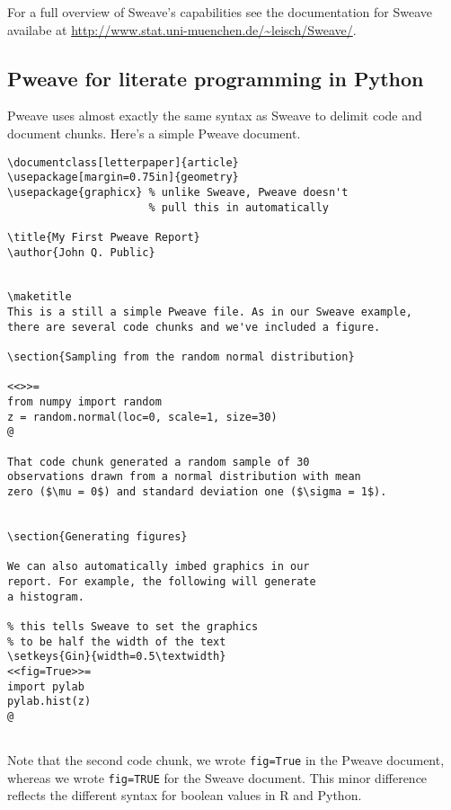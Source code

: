 For a full overview of Sweave's capabilities see the documentation for
Sweave availabe at
\url{http://www.stat.uni-muenchen.de/~leisch/Sweave/}.

\subsection{Pweave for literate programming in Python}

Pweave uses almost exactly the same syntax as Sweave to delimit code and
document chunks. Here's a simple Pweave document.

\begin{lstlisting}
\documentclass[letterpaper]{article}
\usepackage[margin=0.75in]{geometry}
\usepackage{graphicx} % unlike Sweave, Pweave doesn't
                      % pull this in automatically

\title{My First Pweave Report}
\author{John Q. Public}


\maketitle
This is a still a simple Pweave file. As in our Sweave example,
there are several code chunks and we've included a figure.

\section{Sampling from the random normal distribution}

<<>>=
from numpy import random
z = random.normal(loc=0, scale=1, size=30)
@

That code chunk generated a random sample of 30 
observations drawn from a normal distribution with mean 
zero ($\mu = 0$) and standard deviation one ($\sigma = 1$).


\section{Generating figures}

We can also automatically imbed graphics in our 
report. For example, the following will generate 
a histogram.

% this tells Sweave to set the graphics 
% to be half the width of the text
\setkeys{Gin}{width=0.5\textwidth} 
<<fig=True>>=
import pylab
pylab.hist(z)
@


\end{lstlisting}
Note that the second code chunk, we wrote \lstinline!fig=True! in the
Pweave document, whereas we wrote \lstinline!fig=TRUE! for the Sweave
document. This minor difference reflects the different syntax for
boolean values in R and Python.


